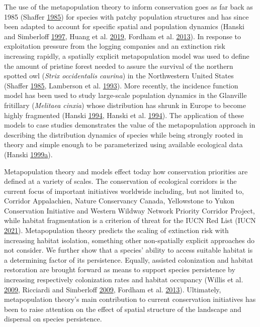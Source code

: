 \documentclass[12pt]{article}
\begin{document}
The use of the metapopulation theory to inform conservation goes as far
back as 1985 (Shaffer
\protect\hyperlink{ref-shaffer_metapopulation_1985}{1985}) for species
with patchy population structures and has since been adapted to account
for specific spatial and population dynamics (Hanski and Simberloff
\protect\hyperlink{ref-hanski_metapopulation_1997}{1997}, Huang et al.
\protect\hyperlink{ref-huang_using_2019}{2019}, Fordham et al.
\protect\hyperlink{ref-fordham_adapted_2013}{2013}). In response to
exploitation pressure from the logging companies and an extinction risk
increasing rapidly, a spatially explicit metapopulation model was used
to define the amount of pristine forest needed to assure the survival of
the northern spotted owl (\emph{Strix occidentalis caurina}) in the
Northwestern United States (Shaffer
\protect\hyperlink{ref-shaffer_metapopulation_1985}{1985}, Lamberson et
al. \protect\hyperlink{ref-lamberson_effects_1993}{1993}). More
recently, the incidence function model has been used to study
large-scale population dynamics in the Glanville fritillary
(\emph{Melitaea cinxia}) whose distribution has shrunk in Europe to
become highly fragmented (Hanski
\protect\hyperlink{ref-hanski_practical_1994}{1994}, Hanski et al.
\protect\hyperlink{ref-hanski_metapopulation_1994}{1994}). The
application of these models to case studies demonstrates the value of
the metapopulation approach in describing the distribution dynamics of
species while being strongly rooted in theory and simple enough to be
parameterized using available ecological data (Hanski
\protect\hyperlink{ref-hanski_metapopulation_1999}{1999}\protect\hyperlink{ref-hanski_metapopulation_1999}{a}).

Metapopulation theory and models effect today how conservation
priorities are defined at a variety of scales. The conservation of
ecological corridors is the current focus of important initiatives
worldwide including, but not limited to, Corridor Appalachien, Nature
Conservancy Canada, Yellowstone to Yukon Conservation Initiative and
Western Wildway Network Priority Corridor Project, while habitat
fragmentation is a criterion of threat for the IUCN Red List (IUCN
\protect\hyperlink{ref-iucn_iucn_2021}{2021}). Metapopulation theory
predicts the scaling of extinction risk with increasing habitat
isolation, something other non-spatially explicit approaches do not
consider. We further show that a species' ability to access suitable
habitat is a determining factor of its persistence. Equally, assisted
colonization and habitat restoration are brought forward as means to
support species persistence by increasing respectively colonization
rates and habitat occupancy (Willis et al.
\protect\hyperlink{ref-willis_assisted_2009}{2009}, Ricciardi and
Simberloff \protect\hyperlink{ref-ricciardi_assisted_2009}{2009},
Fordham et al. \protect\hyperlink{ref-fordham_adapted_2013}{2013}).
Ultimately, metapopulation theory's main contribution to current
conservation initiatives has been to raise attention on the effect of
spatial structure of the landscape and dispersal on species persistence.
\end{document}
